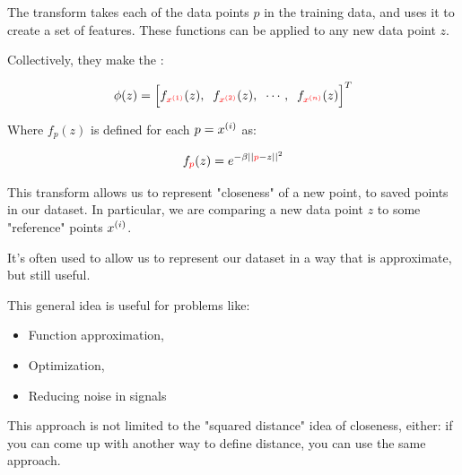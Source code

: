             \begin{definition}
                The  transform takes each of the data points $p$ in the training data, and uses it to create a set of  features. These functions can be applied to any new data point $z$.

                Collectively, they make the :

                \begin{equation*}
                    \phi(z) = 
                    \Big[
                    f_{\textcolor{red}{x^{(1)}}}(z), \;\; 
                    f_{\textcolor{red}{x^{(2)}}}(z), \;\; 
                    \cdots, \;\; 
                    f_{\textcolor{red}{x^{(n)}}}(z)
                    \Big]^T
                \end{equation*}

                Where $f_p(z)$ is defined for each $p=x^{(i)}$ as:

                \begin{equation*}
                    f_{\textcolor{red}{p}}(z) = e^{-\beta ||\textcolor{red}{p}-z||^2 }
                \end{equation*}

                This transform allows us to represent "closeness" of a new point, to saved points in our dataset. In particular, we are comparing a new data point $z$ to some "reference" points $x^{(i)}$.
                
                It's often used to allow us to represent our dataset in a way that is approximate, but still useful.
            \end{definition}

            This general idea is useful for problems like:
            \begin{itemize}
                \item Function approximation,
                \item Optimization,
                \item Reducing noise in signals
            \end{itemize}

            This approach is not limited to the "squared distance" idea of closeness, either: if you can come up with another way to define distance, you can use the same approach.

